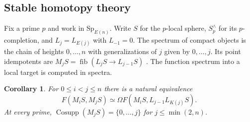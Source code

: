 \documentclass[11pt,reqno]{amsart}
\newtheorem{corollary}[theorem]{Corollary}
\theoremstyle{definition}
\DeclareMathOperator{\Cosupp}{Cosupp}
\DeclareMathOperator{\fib}{fib}
\numberwithin{equation}{section}
\begin{document}
\subsection{Stable homotopy theory}\label{s:chrom}
Fix a prime $p$ and work in $\mathrm{Sp}_{E(n)}$. Write $S$ for the $p$-local sphere, $S_p^\wedge$ for its $p$-completion, and $L_j=L_{E(j)}$ with $L_{-1}=0$. The spectrum of compact objects is the chain of heights $0,\ldots,n$ with generalizations of $j$ given by $0,\ldots,j$. Its point idempotents are $M_jS=\fib(L_jS\to L_{j-1}S)$ \cite[Remark~20.22]{bchs}. The function spectrum into a local target is computed in spectra.

\begin{corollary}\label{c:chrom}
For $0\le i<j\le n$ there is a natural equivalence
\[
 F(M_iS,M_jS)\simeq\Omega F(M_iS,L_{j-1}L_{K(j)}S).
\]
At every prime, $\Cosupp(M_jS)=\{0,\ldots,j\}$ for $j\le\min(2,n)$.
\end{corollary}
\end{document}
